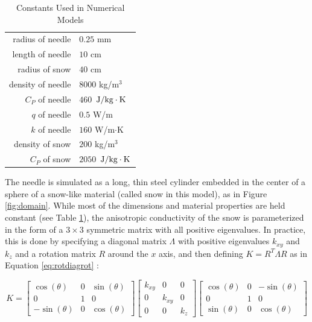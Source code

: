 \begin{table}[h]
\centering
\caption{Constants Used in Numerical Models}
\begin{tabular}{r | l}
radius of needle & \(0.25\) mm\\
length of needle & \(10\) cm\\
radius of snow & \(40\) cm\\
\hline
density of needle & \(8000\) kg/\(\textrm{m}^3\)\\
\(C_P\) of needle & \(460\) \(\left.{\textrm{J}}\middle/{\textrm{kg}\cdot\textrm{K}}\right.\) \\
\(q\) of needle & \(0.5\) W/m\\
\(k\) of needle & \(160\) W/m\(\cdot\)K\\
\hline
density of snow & \(200\) kg/\(\textrm{m}^3\)\\
\(C_P\) of snow & \(2050\)  \(\left.{\textrm{J}}\middle/{\textrm{kg}\cdot\textrm{K}}\right.\)
\end{tabular}
\label{tab:constants}
\end{table}

The needle is simulated as a long, thin steel cylinder embedded in the center
of a sphere of a snow-like material (called snow in this model), as in Figure \ref{fig:domain}. While most of the dimensions
and material properties are held constant (see Table \ref{tab:constants}), the
anisotropic conductivity of the snow is parameterized in the form
of a  \(3\times3\) symmetric matrix with all positive eigenvalues.  In practice, this is
done by specifying a diagonal matrix \(\Lambda\) with positive eigenvalues
\(k_{xy}\) and \(k_z\) and a rotation matrix \(R\) around the \(x\) axis, and
then defining \(K = R^T\Lambda R\) as in Equation \ref{eq:rotdiagrot} :

\begin{equation}
\label{eq:rotdiagrot}
K = \begin{bmatrix}
\cos(\theta) & 0 & \sin(\theta)\\
0 & 1 & 0\\
-\sin(\theta) & 0 &\cos(\theta)
\end{bmatrix}
\begin{bmatrix}
k_{xy} & 0 & 0\\
0 & k_{xy} & 0\\
0 & 0 & k_z
\end{bmatrix}
\begin{bmatrix}
\cos(\theta) & 0 & -\sin(\theta)\\
0 & 1 & 0\\
\sin(\theta) & 0 &\cos(\theta)
\end{bmatrix}
\end{equation}

